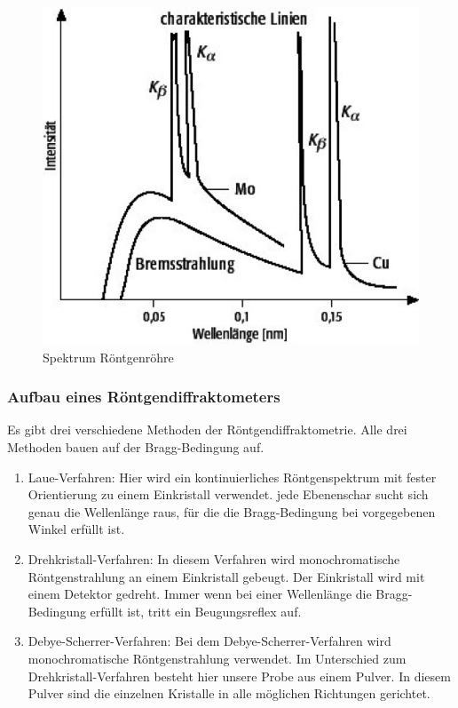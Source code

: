             \begin{figure}
                \centering
                \includegraphics{images/Spektrum_Röntgenröhre.jpg}
                \caption{Spektrum Röntgenröhre}
            \end{figure}

        \subsubsection{Aufbau eines Röntgendiffraktometers}   
            Es gibt drei verschiedene Methoden der Röntgendiffraktometrie. Alle drei Methoden bauen auf der Bragg-Bedingung auf.
            \begin{enumerate}
                \item   Laue-Verfahren: Hier wird ein kontinuierliches Röntgenspektrum mit fester Orientierung zu einem Einkristall verwendet. 
                        jede Ebenenschar sucht sich genau die Wellenlänge raus, für die die Bragg-Bedingung bei vorgegebenen Winkel erfüllt ist.
                \item   Drehkristall-Verfahren: In diesem Verfahren wird monochromatische Röntgenstrahlung an einem Einkristall gebeugt. Der Einkristall 
                        wird mit einem Detektor gedreht. Immer wenn bei einer Wellenlänge die Bragg-Bedingung erfüllt ist, tritt ein Beugungsreflex auf.
                \item   Debye-Scherrer-Verfahren: Bei dem Debye-Scherrer-Verfahren wird monochromatische Röntgenstrahlung verwendet. Im Unterschied
                        zum Drehkristall-Verfahren besteht hier unsere Probe aus einem Pulver. In diesem Pulver sind die einzelnen Kristalle in alle möglichen 
                        Richtungen gerichtet. 
            \end{enumerate}

